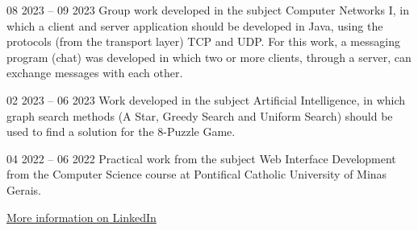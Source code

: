 \documentclass[10pt,a4paper,ragged2e,withhyper]{altacv}
\begin{document}
\begin{paracol}{2}
            {
            }{08 2023 -- 09 2023}{}
            Group work developed in the subject Computer Networks I, in which a client and server application should be developed in Java, using the protocols (from the transport layer) TCP and UDP. For this work, a messaging program (chat) was developed in which two or more clients, through a server, can exchange messages with each other.\\
            \divider
        
            {
            }{02 2023 -- 06 2023}{}
            Work developed in the subject Artificial Intelligence, in which graph search methods (A Star, Greedy Search and Uniform Search) should be used to find a solution for the 8-Puzzle Game.\\
            \divider
            
            {
            }{04 2022 -- 06 2022}{}
            Practical work from the subject Web Interface Development from the Computer Science course at Pontifical Catholic University of Minas Gerais.\\
            \divider

            {\large\color{emphasis}\href{https://www.linkedin.com/in/henriquemcc/details/projects/}{More information on LinkedIn}}
    \end{paracol}
\end{document}
